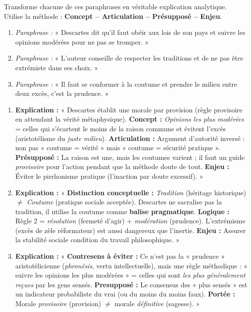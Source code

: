 \documentclass[11pt]{article}
\newcommand{\cle}[1]{{\popxbold\color{popdark}#1}}
\begin{document}
\begin{exercice}
Transforme chacune de ces paraphrases en véritable explication analytique. Utilise la méthode : \textbf{Concept -- Articulation -- Présupposé -- Enjeu}.
\begin{enumerate}
    \item \textit{Paraphrase :} « Descartes dit qu'il faut obéir aux lois de son pays et suivre les opinions modérées pour ne pas se tromper. »
    \item \textit{Paraphrase :} « L'auteur conseille de respecter les traditions et de ne pas être extrémiste dans ses choix. »
    \item \textit{Paraphrase :} « Il faut se conformer à la coutume et prendre le milieu entre deux excès, c'est la prudence. »
\end{enumerate}
\end{exercice}

\begin{corrige}
\begin{enumerate}
    \item \textbf{Explication :} « Descartes établit une \cle{morale par provision} (règle provisoire en attendant la vérité métaphysique). \textbf{Concept :} \emph{Opinions les plus modérées} = celles qui s'écartent le moins de la raison commune et évitent l'excès (aristotélisme du \emph{juste milieu}). \textbf{Articulation :} Argument d'autorité inversé : non pas « coutume = vérité » mais « coutume = sécurité pratique ». \textbf{Présupposé :} La raison est une, mais les coutumes varient ; il faut un guide \emph{provisoire} pour l'action pendant que la méthode doute de tout. \textbf{Enjeu :} Éviter le \cle{pirrhonisme} pratique (l'inaction par doute excessif). »
    \item \textbf{Explication :} « \textbf{Distinction conceptuelle :} \emph{Tradition} (héritage historique) $\neq$ \emph{Coutume} (pratique sociale acceptée). Descartes ne sacralise pas la tradition, il utilise la coutume comme \textbf{balise pragmatique}. \textbf{Logique :} Règle 2 = \emph{résolution} (fermeté d'agir) + \emph{modération} (prudence). L'extrémisme (excès de zèle réformateur) est aussi dangereux que l'inertie. \textbf{Enjeu :} Assurer la \cle{stabilité sociale} condition du travail philosophique. »
    \item \textbf{Explication :} « \textbf{Contresens à éviter :} Ce n'est pas la « prudence » aristotélicienne (\emph{phronêsis}, vertu intellectuelle), mais une \cle{règle méthodique} : « suivre les opinions les plus modérées » = celles qui sont \emph{les plus généralement reçues} par les gens sensés. \textbf{Presupposé :} Le consensus des « plus sensés » est un indicateur probabiliste du vrai (ou du moins du moins faux). \textbf{Portée :} Morale \emph{provisoire} (provision) $\neq$ morale \emph{définitive} (sagesse). »
\end{enumerate}
\end{corrige}
\end{document}
